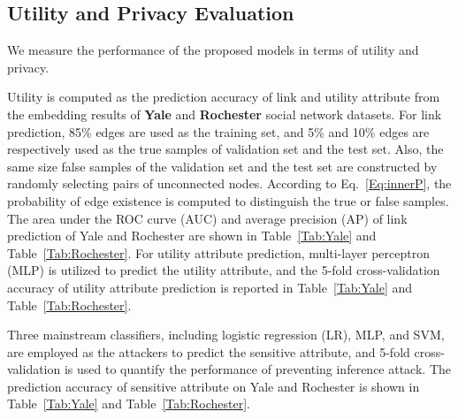 \documentclass{article}
\begin{document}
\subsection{Utility and Privacy Evaluation}
We measure the performance of the proposed models in terms of utility and privacy.


Utility is computed as the prediction accuracy of link and utility attribute from the embedding results of \textbf{Yale} and \textbf{Rochester} social network datasets.
For link prediction, 85\% edges are used as the training set, and 5\% and 10\% edges are respectively used as the true samples of validation set and the test set. Also, the same size false samples of the validation set and the test set are constructed by randomly selecting pairs of unconnected nodes.
According to Eq.~\ref{Eq:innerP}, the probability of edge existence is computed to distinguish the true or false samples. The area under the ROC curve (AUC) and average precision (AP) of link prediction of Yale and Rochester are shown  in Table~\ref{Tab:Yale} and Table~\ref{Tab:Rochester}.
For utility attribute prediction, multi-layer perceptron (MLP) is utilized to predict the utility attribute, and the 5-fold cross-validation accuracy of utility attribute prediction is reported in Table~\ref{Tab:Yale} and Table~\ref{Tab:Rochester}.



Three mainstream classifiers, including logistic regression (LR), MLP, and SVM, are employed as the attackers to predict the sensitive attribute, and 5-fold cross-validation is used to quantify the performance of preventing inference attack. The prediction accuracy of sensitive attribute on Yale and Rochester is shown in Table~\ref{Tab:Yale} and Table~\ref{Tab:Rochester}.
\end{document}
